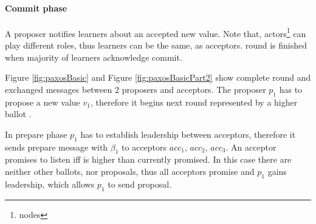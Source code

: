 \paragraph{Commit phase}
A proposer notifies learners about an accepted new value. Note that, actors\footnote{nodes} can play different roles, thus learners can be the same, as acceptors. \paxos round is finished when majority of learners acknowledge commit.



Figure \ref{fig:paxosBasic} and Figure \ref{fig:paxosBasicPart2} show complete \paxos round and exchanged messages between $2$ proposers and acceptors. The proposer $p_1$ has to propose a new value $v_1$, therefore it begins next \paxos round represented by a higher ballot \ballot.

In prepare phase $p_1$ has to establish leadership between acceptors, therefore it sends prepare message with $\beta_1$ to acceptors $acc_1$, $acc_2$, $acc_3$. An acceptor promises to listen iff \ballot is higher than currently promised. In this case there are neither other ballots, nor proposals, thus all acceptors promise and $p_1$ gains leadership, which allows $p_1$ to send proposal.

